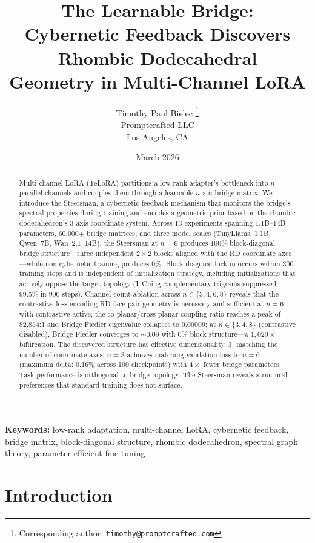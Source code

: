 \documentclass[11pt]{article}
\title{%
  The Learnable Bridge:\\
  Cybernetic Feedback Discovers Rhombic Dodecahedral\\
  Geometry in Multi-Channel LoRA%
}
\author{%
  Timothy Paul Bielec%
  \thanks{Corresponding author. \texttt{timothy@promptcrafted.com}}%
  \\
  Promptcrafted LLC\\
  Los Angeles, CA
}
\date{March 2026}
\begin{document}
\maketitle

\begin{abstract}
Multi-channel LoRA (TeLoRA) partitions a low-rank adapter's
bottleneck into $n$ parallel channels and couples them through a
learnable $n \times n$ bridge matrix. We introduce the Steersman, a
cybernetic feedback mechanism that monitors the bridge's spectral
properties during training and encodes a geometric prior based on the
rhombic dodecahedron's 3-axis coordinate system. Across 13 experiments
spanning 1.1B--14B parameters, 60{,}000+ bridge matrices, and three
model scales (TinyLlama~1.1B, Qwen~7B, Wan~2.1~14B), the
Steersman at $n = 6$ produces 100\% block-diagonal bridge
structure---three independent $2 \times 2$ blocks aligned with the RD
coordinate axes---while non-cybernetic training produces 0\%.
Block-diagonal lock-in occurs within 300 training steps and is
independent of initialization strategy, including initializations that
actively oppose the target topology (I~Ching complementary trigrams
suppressed 99.5\% in 900 steps). Channel-count ablation across
$n \in \{3, 4, 6, 8\}$ reveals that the contrastive loss encoding RD
face-pair geometry is necessary and sufficient at $n = 6$: with
contrastive active, the co-planar/cross-planar coupling ratio reaches a
peak of 82{,}854:1 and Bridge Fiedler eigenvalue collapses to 0.00009;
at $n \in \{3, 4, 8\}$ (contrastive disabled), Bridge Fiedler converges
to ${\sim}0.09$ with 0\% block structure---a $1{,}020\times$
bifurcation. The discovered structure has effective dimensionality~3,
matching the number of coordinate axes: $n = 3$ achieves
matching validation loss to $n = 6$ (maximum delta: 0.16\% across 100
checkpoints) with $4\times$ fewer bridge parameters. Task performance is
orthogonal to bridge topology. The
Steersman reveals structural preferences that standard training does
not surface.
\end{abstract}

\noindent\textbf{Keywords:} low-rank adaptation, multi-channel LoRA,
cybernetic feedback, bridge matrix, block-diagonal structure,
rhombic dodecahedron, spectral graph theory, parameter-efficient fine-tuning

\section{Introduction}
\label{sec:intro}
\end{document}
